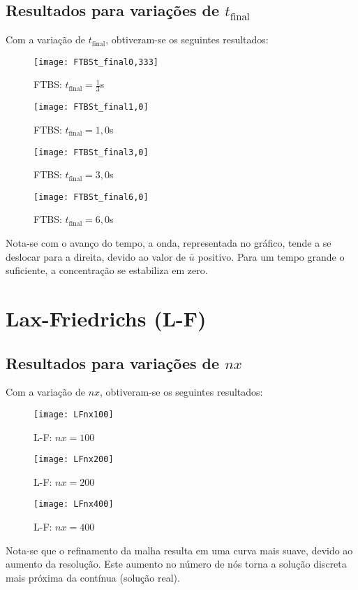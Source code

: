 \subsection{Resultados para variações de $t_{\text{final}}$}
Com a variação de $t_{\text{final}}$, obtiveram-se os seguintes resultados:
\begin{figure}[H]
    \centering
    \texttt{[image: FTBSt\_final0,333]}
    \caption{FTBS: $t_{\text{final}} = \frac{1}{3}$s}
\end{figure}
\begin{figure}[H]
    \centering
    \texttt{[image: FTBSt\_final1,0]}
    \caption{FTBS: $t_{\text{final}} = 1,0$s}
\end{figure}
\begin{figure}[H]
    \centering
    \texttt{[image: FTBSt\_final3,0]}
    \caption{FTBS: $t_{\text{final}} = 3,0$s}
\end{figure}
\begin{figure}[H]
    \centering
    \texttt{[image: FTBSt\_final6,0]}
    \caption{FTBS: $t_{\text{final}} = 6,0$s}
\end{figure}
Nota-se com o avanço do tempo, a onda, representada no gráfico, tende a se
deslocar para a direita, devido ao valor de $\bar{u}$ positivo. Para um tempo
grande o suficiente, a concentração se estabiliza em zero.

\section{Lax-Friedrichs (L-F)}

\subsection{Resultados para variações de $nx$}
Com a variação de $nx$, obtiveram-se os seguintes resultados:
\begin{figure}[H]
    \centering
    \texttt{[image: LFnx100]}
    \caption{L-F: $nx = 100$}
\end{figure}
\begin{figure}[H]
    \centering
    \texttt{[image: LFnx200]}
    \caption{L-F: $nx = 200$}
\end{figure}
\begin{figure}[H]
    \centering
    \texttt{[image: LFnx400]}
    \caption{L-F: $nx = 400$}
\end{figure}
Nota-se que o refinamento da malha resulta em uma curva mais suave, devido ao
aumento da resolução. Este aumento no número de nós torna a solução discreta
mais próxima da contínua (solução real).

